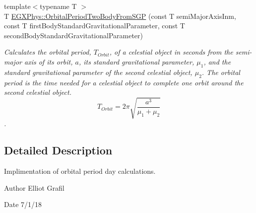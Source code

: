 \begin{DoxyCompactItemize}
{\footnotesize template$<$typename T $>$ }\\T \mbox{\hyperlink{group___e_g_x_phys-_astrophysic-_orbital_period_ga53ff53aea547ddedfc69119c4830daea}{E\+G\+X\+Phys\+::\+Orbital\+Period\+Two\+Body\+From\+S\+GP}} (const T semi\+Major\+Axis\+Inm, const T first\+Body\+Standard\+Gravitational\+Parameter, const T second\+Body\+Standard\+Gravitational\+Parameter)
\begin{DoxyCompactList}\small\item\em Calculates the orbital period, $T_{Orbit}$, of a celestial object in seconds from the semi-\/major axis of its orbit, $a$, its standard gravitational parameter, $\mu_1$, and the standard gravitational parameter of the second celestial object, $\mu_2$. The orbital period is the time needed for a celestial object to complete one orbit around the second celestial object. \[ T_{Orbit}=2\pi\sqrt{\dfrac{a^3}{\mu_1 + \mu_2}}\]. \end{DoxyCompactList}\end{DoxyCompactItemize}


\subsection{Detailed Description}
Implimentation of orbital period day calculations. 

\begin{DoxyAuthor}{Author}
Elliot Grafil 
\end{DoxyAuthor}
\begin{DoxyDate}{Date}
7/1/18 
\end{DoxyDate}
